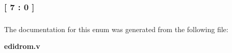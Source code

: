 \subsubsection[{data}]{ {\bfseries \textcolor{vhdlchar}{[}\textcolor{vhdlchar}{ } \textcolor{vhdldigit}{7} \textcolor{vhdlchar}{ }\textcolor{vhdlchar}{\-:}\textcolor{vhdlchar}{ } \textcolor{vhdldigit}{0} \textcolor{vhdlchar}{ }\textcolor{vhdlchar}{]}\textcolor{vhdlchar}{ }} \hspace{0.3cm}}\label{enum1edidrom_add2369651b8eb9a36a43c7c38aa0b706}
\subsubsection[{data}]{ {\bfseries \textcolor{vhdlchar}{ }} \hspace{0.3cm}}\label{enum1edidrom_a72d47feeea318e0f0de1e9e16ec84232}


The documentation for this enum was generated from the following file\-:\begin{DoxyCompactItemize}
\item 
{\bf edidrom.\-v}\end{DoxyCompactItemize}
